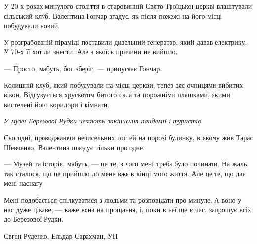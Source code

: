 У 20-х роках минулого століття в старовинній Свято-Троїцької церкві влаштували сільський клуб. Валентина Гончар згадує, як після пожежі на його місці побудували новий.

У розграбованій піраміді поставили дизельний генератор, який давав електрику. У 70-х її хотіли знести. Але з якоїсь причини не вийшло.

--- Просто, мабуть, бог зберіг, --- припускає Гончар.

Колишній клуб, який побудували на місці церкви, тепер зяє очницями вибитих вікон. Відгукується хрускотом битого скла та порожніми пляшками, якими вистелені його коридори і кімнати.

\emph{У музеї Березової Рудки чекають закінчення пандемії і туристів}

Сьогодні, проводжаючи нечисельних гостей на порозі будинку, в якому жив Тарас
Шевченко, Валентина шкодує тільки про одне.

--- Музей та історія, мабуть, --- це те, з чого мені треба було починати. На жаль,
так сталося, що це прийшло до мене вже в кінці мого життя. Але це те, що дає
мені наснагу. 

Мені подобається спілкуватися з людьми та розповідати про минуле. А воно у нас
дуже цікаве, --- каже вона на прощання, і, поки в неї ще є час, запрошує всіх до
Березової Рудки.

Євген Руденко, Ельдар Сарахман, УП
